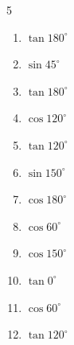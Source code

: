 \begin{multicols}{5}
\begin{enumerate}
        \phantom{$\displaystyle =1$}

  \item $\displaystyle \tan{180^\circ}$

        \phantom{$\displaystyle =0$}

  \item $\displaystyle \sin{45^\circ}$


  \item $\displaystyle \tan{180^\circ}$

        \phantom{$\displaystyle =0$}

  \item $\displaystyle \cos{120^\circ}$


  \item $\displaystyle \tan{120^\circ}$


  \item $\displaystyle \sin{150^\circ}$


\columnbreak %

  \item $\displaystyle \cos{180^\circ}$

        \phantom{$\displaystyle =-1$}

  \item $\displaystyle \cos{60^\circ}$


  \item $\displaystyle \cos{150^\circ}$


  \item $\displaystyle \tan{0^\circ}$

        \phantom{$\displaystyle =0$}

  \item $\displaystyle \cos{60^\circ}$


  \item $\displaystyle \tan{120^\circ}$



\end{enumerate}
\end{multicols}

